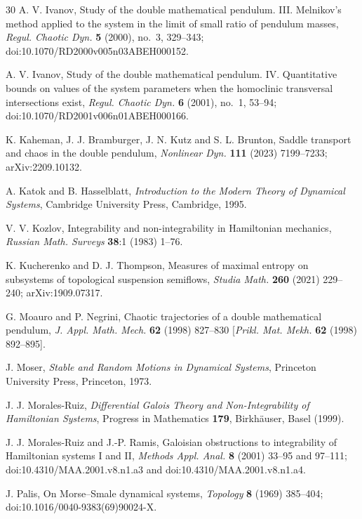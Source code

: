 \documentclass[11pt]{article}
\theoremstyle{definition}
\begin{document}
\begin{thebibliography}{30}
 A. V. Ivanov, Study of the double mathematical pendulum. III. Melnikov's method applied to the system in the limit of small ratio of pendulum masses, \emph{Regul. Chaotic Dyn.} \textbf{5} (2000), no.~3, 329--343; doi:10.1070/RD2000v005n03ABEH000152.

 A. V. Ivanov, Study of the double mathematical pendulum. IV. Quantitative bounds on values of the system parameters when the homoclinic transversal intersections exist, \emph{Regul. Chaotic Dyn.} \textbf{6} (2001), no.~1, 53--94; doi:10.1070/RD2001v006n01ABEH000166.

 K. Kaheman, J. J. Bramburger, J. N. Kutz and S. L. Brunton, Saddle transport and chaos in the double pendulum, \emph{Nonlinear Dyn.} \textbf{111} (2023) 7199--7233; arXiv:2209.10132.

 A. Katok and B. Hasselblatt, \emph{Introduction to the Modern Theory of Dynamical Systems}, Cambridge University Press, Cambridge, 1995.

 V. V. Kozlov, Integrability and non-integrability in Hamiltonian mechanics, \emph{Russian Math. Surveys} \textbf{38}:1 (1983) 1--76.

 K. Kucherenko and D. J. Thompson, Measures of maximal entropy on subsystems of topological suspension semiflows, \emph{Studia Math.} \textbf{260} (2021) 229--240; arXiv:1909.07317.

 G. Moauro and P. Negrini, Chaotic trajectories of a double mathematical pendulum, \emph{J. Appl. Math. Mech.} \textbf{62} (1998) 827--830 [\emph{Prikl. Mat. Mekh.} \textbf{62} (1998) 892--895].

 J. Moser, \emph{Stable and Random Motions in Dynamical Systems}, Princeton University Press, Princeton, 1973.

 J. J. Morales-Ruiz, \emph{Differential Galois Theory and Non-Integrability of Hamiltonian Systems}, Progress in Mathematics \textbf{179}, Birkh\"auser, Basel (1999).

 J. J. Morales-Ruiz and J.-P. Ramis, Galoisian obstructions to integrability of Hamiltonian systems I and II, \emph{Methods Appl. Anal.} \textbf{8} (2001) 33--95 and 97--111; doi:10.4310/MAA.2001.v8.n1.a3 and doi:10.4310/MAA.2001.v8.n1.a4.

 J. Palis, On Morse--Smale dynamical systems, \emph{Topology} \textbf{8} (1969) 385--404; doi:10.1016/0040-9383(69)90024-X.


\end{thebibliography}
\end{document}
